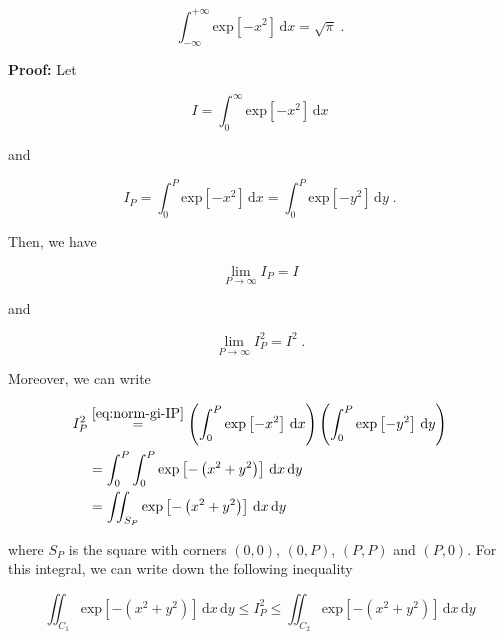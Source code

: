 \documentclass[a4paper,12pt,twoside]{book}
\begin{document}
\begin{equation} \label{eq:norm-gi-norm-gi}
\int_{-\infty}^{+\infty} \mathrm{exp}\left[ -x^2 \right] \, \mathrm{d}x = \sqrt{\pi} \; .
\end{equation}


\vspace{1em}
\textbf{Proof:} Let

\begin{equation} \label{eq:norm-gi-I}
I = \int_{0}^{\infty} \mathrm{exp}\left[ -x^2 \right] \, \mathrm{d}x
\end{equation}

and 

\begin{equation} \label{eq:norm-gi-IP}
I_P = \int_{0}^{P} \mathrm{exp}\left[ -x^2 \right] \, \mathrm{d}x = \int_{0}^{P} \mathrm{exp}\left[ -y^2 \right] \, \mathrm{d}y \; .
\end{equation}

Then, we have

\begin{equation} \label{eq:norm-gi-IP-I}
\lim\limits_{P \rightarrow \infty} I_P = I
\end{equation}

and

\begin{equation} \label{eq:norm-gi-IP2-I2}
\lim\limits_{P \rightarrow \infty} I_P^2 = I^2 \; .
\end{equation}

Moreover, we can write

\begin{equation} \label{eq:norm-gi-IP2}
\begin{split}
I_P^2 &\overset{\eqref{eq:norm-gi-IP}}{=} \left( \int_{0}^{P} \mathrm{exp}\left[ -x^2 \right] \, \mathrm{d}x \right) \left( \int_{0}^{P} \mathrm{exp}\left[ -y^2 \right] \, \mathrm{d}y \right) \\
&= \int_{0}^{P} \int_{0}^{P} \mathrm{exp}\left[ - \left( x^2 + y^2 \right) \right] \, \mathrm{d}x \, \mathrm{d}y \\
&= \iint_{S_P} \mathrm{exp}\left[ - \left( x^2 + y^2 \right) \right] \, \mathrm{d}x \, \mathrm{d}y
\end{split}
\end{equation}

where $S_P$ is the square with corners $(0,0)$, $(0,P)$, $(P,P)$ and $(P,0)$. For this integral, we can write down the following inequality

\begin{equation} \label{eq:norm-gi-IP2-ineq}
\iint_{C_1} \mathrm{exp}\left[ - \left( x^2 + y^2 \right) \right] \, \mathrm{d}x \, \mathrm{d}y \leq I_P^2 \leq \iint_{C_2} \mathrm{exp}\left[ - \left( x^2 + y^2 \right) \right] \, \mathrm{d}x \, \mathrm{d}y
\end{equation}
\end{document}
